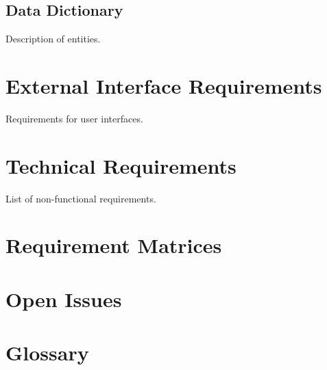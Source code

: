 \documentclass[12pt]{article}
\begin{document}
\subsection{Data Dictionary}
Description of entities.

\section{External Interface Requirements}
Requirements for user interfaces.

\section{Technical Requirements}
List of non-functional requirements.

\section{Requirement Matrices}

\section{Open Issues}

\section{Glossary}
\end{document}
